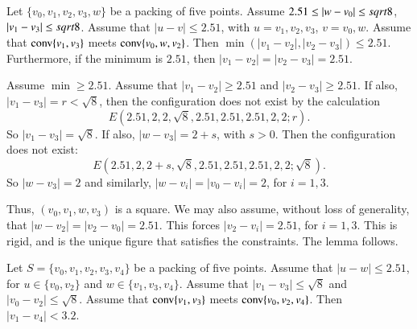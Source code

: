 \begin{tarskidata}
\begin{tarski}
%

\begin{lemma} 
Let $\{v_0,v_1,v_2,v_3,w\}$  be a packing of five points.
Assume $2.51\le|w-v_0|\le sqrt8$, $|v_1-v_3|\le sqrt8$.
Assume that $|u-v|\le 2.51$, with $u=v_1,v_2,v_3$,
$v=v_0,w$.
Assume that ${\operatorname{conv}}\{v_1,v_3\}$ meets ${\operatorname{conv}}\{v_0,w,v_2\}$.
Then
$\min(|v_1-v_2|,|v_2-v_3|)\le2.51$. Furthermore, if the minimum is
$2.51$, then $|v_1-v_2|=|v_2-v_3|=2.51$.
\end{lemma}


\begin{proved}
Assume $\min\ge2.51$.  Assume that $|v_1-v_2|\ge 2.51$ and $|v_2-v_3|\ge2.51$.
If also, $|v_1-v_3|=r<\sqrt8$, then the configuration does not
exist by the calculation
  $$
  E(2.51,2,2,\sqrt8,2.51,2.51,2.51,2,2; r).
  $$
So $|v_1-v_3|=\sqrt8$.
If also, $|w-v_3|=2+s$, with $s>0$.  
Then the configuration does not exist:
  $$
  E(2.51,2,2+s,\sqrt8,2.51,2.51,2.51,2,2;\sqrt8). 
  $$
So $|w-v_3|=2$ and similarly, $|w-v_i|=|v_0-v_i|=2$, for $i=1,3$.

Thus, $(v_0,v_1,w,v_3)$ is a square.
 We may also assume, without loss of generality, that
$|w-v_2|=|v_2-v_0|=2.51$. This forces $|v_2-v_i|=2.51$, for $i=1,3$.
This is rigid,  and is the unique figure that satisfies the
constraints. The lemma follows.
\swallowed\end{proved}
\end{tarski}









\begin{tarski}

\begin{lemma}
Let $S=\{v_0,v_1,v_2,v_3,v_4\}$ be a packing of five points.
Assume that $|u-w|\le 2.51$, for
$u\in\{v_0,v_2\}$ and $w\in\{v_1,v_3,v_4\}$.
Assume that $|v_1-v_3|\le \sqrt8$ and $|v_0-v_2|\le\sqrt8$.
Assume that ${\operatorname{conv}}\{v_1,v_3\}$ meets ${\operatorname{conv}}\{v_0,v_2,v_4\}$.
Then $|v_1-v_4|< 3.2$.
\end{lemma}


\end{tarski}
\end{tarskidata}
